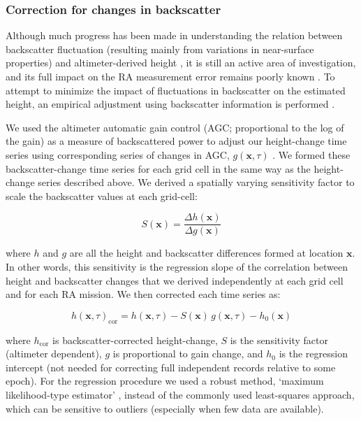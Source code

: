 \subsubsection{Correction for changes in backscatter}
\label{sec:bs-corr}

Although much progress has been made in understanding the relation between backscatter fluctuation (resulting mainly from variations in near-surface properties) and altimeter-derived height \parencite{Arthern2001, Davis1993, Legresy1998, Partington1989, Remy2012, Ridley1988}, it is still an active area of investigation, and its full impact on the RA measurement error remains poorly known \parencite{Remy2012}. To attempt to minimize the impact of fluctuations in backscatter on the estimated height, an empirical adjustment using backscatter information is performed \parencite[as have been applied by,][]{Davis2004, Khvorostovsky2012, Remy2009, Wingham2006, Wingham1998, Zwally2005}.

We used the altimeter automatic gain control (AGC; proportional to the log of the gain) as a measure of backscattered power to adjust our height-change time series using corresponding series of changes in AGC, $g(\mathbf x,\tau)$ \parencite{Zwally2005}. We formed these backscatter-change time series for each grid cell in the same way as the height-change series described above. We derived a spatially varying sensitivity factor to scale the backscatter values at each grid-cell:

\begin{equation}
  S(\mathbf x) = \frac{\Delta h(\mathbf x)}{\Delta g(\mathbf x)}
\end{equation}

\noindent
where $h$ and $g$ are all the height and backscatter differences formed at location $\mathbf x$. In other words, this sensitivity is the regression slope of the correlation between height and backscatter changes that we derived independently at each grid cell and for each RA mission. We then corrected each time series as:

\begin{equation}
  h(\mathbf x,\tau)_\text{cor} = h(\mathbf x,\tau) 
    - S(\mathbf x) \, g(\mathbf x,\tau) - h_0(\mathbf x)
  \label{c2e4}
\end{equation}

\noindent
where $h_\text{cor}$ is backscatter-corrected height-change, $S$ is the sensitivity factor (altimeter dependent), $g$ is proportional to gain change, and $h_0$ is the regression intercept (not needed for correcting full independent records relative to some epoch). For the regression procedure we used a robust method, `maximum likelihood-type estimator' \parencite[][p. 43]{Huber1981}, instead of the commonly used least-squares approach, which can be sensitive to outliers (especially when few data are available).


